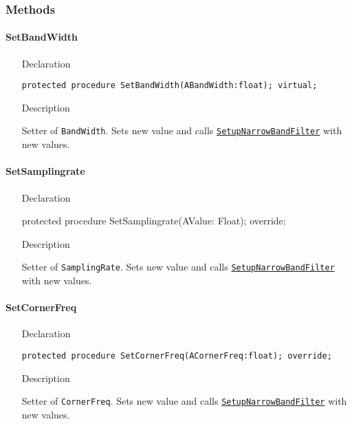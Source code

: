 \documentclass[12pt,a4paper,oneside]{report}
\newcommand{\declarationitem}[1]{{\addfontfeatures{FakeSlant} #1}}
\newcommand{\descriptiontitle}[1]{{\addfontfeatures{FakeSlant}#1}}
\newcommand{\code}[1]{\texttt{#1}}
\begin{document}
\subsubsection{Methods}
\paragraph{SetBandWidth}
\label{lmRecursFilters.TNarrowBandFilter-SetBandWidth}
\begin{itemize}\item[\declarationitem{Declaration}\hfill]
	\begin{flushleft}
		\code{protected procedure SetBandWidth(ABandWidth:float); virtual;}
	\end{flushleft}
	\item[\descriptiontitle{Description}\hfill] 
		\begin{flushleft}
		Setter of \code{BandWidth}. Sets new value and calls \hyperref[lmRecursFilters.TNarrowBandFilter-SetupNarrowBandFilter]{\code{SetupNarrowBandFilter}} with new values.
	\end{flushleft}
\end{itemize}
\paragraph{SetSamplingrate}
\label{lmRecursFilters.TNarrowBandFilter-SetSamplingrate}
\begin{itemize}\item[\declarationitem{Declaration}\hfill]
	\begin{flushleft}
			protected procedure SetSamplingrate(AValue: Float); override;
	\end{flushleft}
	\item[\descriptiontitle{Description}\hfill] 
\begin{flushleft}
	Setter of \code{SamplingRate}. Sets new value and calls \hyperref[lmRecursFilters.TNarrowBandFilter-SetupNarrowBandFilter]{\code{SetupNarrowBandFilter}} with new values.
\end{flushleft}
\end{itemize}
\paragraph{SetCornerFreq}
\label{lmRecursFilters.TNarrowBandFilter-SetCutFreq1}
\begin{itemize}\item[\declarationitem{Declaration}\hfill]
	\begin{flushleft}
			\code{protected procedure SetCornerFreq(ACornerFreq:float); override;}
	\end{flushleft}
	\item[\descriptiontitle{Description}\hfill] 
\begin{flushleft}
	Setter of \code{CornerFreq}. Sets new value and calls \hyperref[lmRecursFilters.TNarrowBandFilter-SetupNarrowBandFilter]{\code{SetupNarrowBandFilter}} with new values.
\end{flushleft}
\end{itemize}
\end{document}
